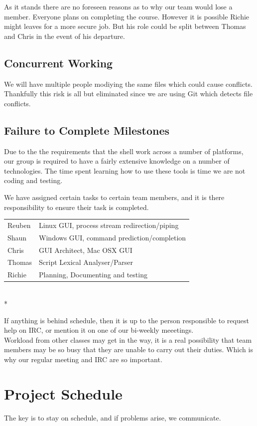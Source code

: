 \documentclass[a4paper,12pt]{article}
\begin{document}
As it stands there are no foreseen reasons as to why our team would lose a member. Everyone plans on completing the course. However it is possible Richie might leaves for a more secure job. But his role  could be split between Thomas and Chris in the event of his departure. 

\subsection*{Concurrent Working}
We will have multiple people modiying the same files which could cause conflicts. Thankfully this risk is all but eliminated since we are using Git which detects file conflicts.

\subsection*{Failure to Complete Milestones}
Due to the the requirements that the shell work across a number of platforms, our group is required to have a fairly extensive knowledge on a number of technologies. The time spent learning how to use these tools is time we are not coding and testing.

We have assigned certain tasks to certain team members, and it is there responsibility to ensure their task is completed.\\

\begin{tabular}{l l}
  Reuben & Linux GUI,  process stream redirection/piping \\
  Shaun & Windows GUI, command prediction/completion \\
  Chris & GUI Architect, Mac OSX GUI \\
  Thomas & Script Lexical Analyser/Parser \\
  Richie & Planning, Documenting and testing \\
\end{tabular}\\*

If anything is behind schedule, then it is up to the person responsible to request help on IRC, or mention it on one of our bi-weekly meeetings.\\

Workload from other classes may get in the way, it is a real possibility that team members may be so busy that they are unable to carry out their duties. Which is why our regular meeting and IRC are so important.
\pagebreak
\section*{Project Schedule}
The key is to stay on schedule, and if problems arise, we communicate.
\end{document}
